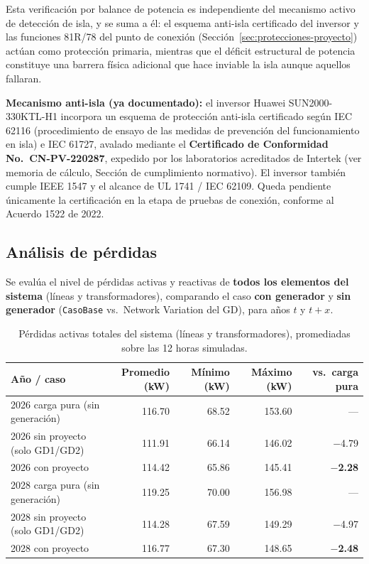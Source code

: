 \documentclass[11pt,a4paper]{article}
\begin{document}
Esta verificaci\'on por balance de potencia es independiente del mecanismo activo de detecci\'on de isla, y se suma a \'el: el esquema anti-isla certificado del inversor y las funciones 81R/78 del punto de conexi\'on (Secci\'on~\ref{sec:protecciones-proyecto}) act\'uan como protecci\'on primaria, mientras que el d\'eficit estructural de potencia constituye una barrera f\'isica adicional que hace inviable la isla aunque aquellos fallaran.

\textbf{Mecanismo anti-isla (ya documentado):} el inversor Huawei SUN2000-330KTL-H1 incorpora un esquema de protecci\'on anti-isla certificado seg\'un IEC 62116 (procedimiento de ensayo de las medidas de prevenci\'on del funcionamiento en isla) e IEC 61727, avalado mediante el \textbf{Certificado de Conformidad No.\ CN-PV-220287}, expedido por los laboratorios acreditados de Intertek (ver memoria de c\'alculo, Secci\'on de cumplimiento normativo). El inversor tambi\'en cumple IEEE 1547 y el alcance de UL 1741 / IEC 62109. Queda pendiente \'unicamente la certificaci\'on en la etapa de pruebas de conexi\'on, conforme al Acuerdo 1522 de 2022.

\subsection{An\'alisis de p\'erdidas}
Se eval\'ua el nivel de p\'erdidas activas y reactivas de \textbf{todos los elementos del sistema} (l\'ineas y transformadores), comparando el caso \textbf{con generador} y \textbf{sin generador} (\texttt{CasoBase} vs.\ Network Variation del GD), para a\~nos $t$ y $t+x$.
\begin{table}[H]
\centering
\caption{P\'erdidas activas totales del sistema (l\'ineas y transformadores), promediadas sobre las 12 horas simuladas.}
\begin{tabular}{lrrrr}
\toprule
A\~no / caso & Promedio (kW) & M\'inimo (kW) & M\'aximo (kW) & vs.\ carga pura \\
\midrule
2026 carga pura (sin generaci\'on) & 116.70 & 68.52 & 153.60 & --- \\
2026 sin proyecto (solo GD1/GD2) & 111.91 & 66.14 & 146.02 & $-$4.79 \\
2026 con proyecto & 114.42 & 65.86 & 145.41 & \textbf{$-$2.28} \\
\midrule
2028 carga pura (sin generaci\'on) & 119.25 & 70.00 & 156.98 & --- \\
2028 sin proyecto (solo GD1/GD2) & 114.28 & 67.59 & 149.29 & $-$4.97 \\
2028 con proyecto & 116.77 & 67.30 & 148.65 & \textbf{$-$2.48} \\
\bottomrule
\end{tabular}
\end{table}
\end{document}
